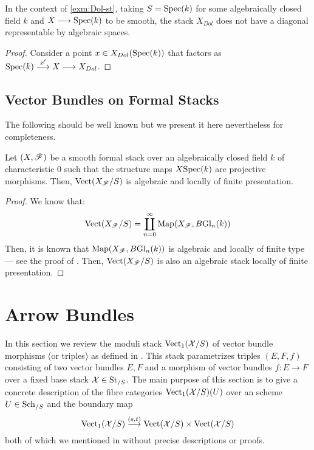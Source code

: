 \documentclass[11pt]{amsart}
\begin{document}
\begin{prop}\label{prop:Dol-st-diag-non-rep}
In the context of \cref{exm:Dol-st}, taking $S = \mathrm{Spec}(k)$ for some
algebraically closed field $k$ and $X \to \Spec(k)$ to be smooth,
the stack $X_{Dol}$ does not have a diagonal representable by algebraic spaces.
\end{prop}
\begin{proof}
Consider a point $x \in X_{Dol}(\mathrm{Spec}(k))$ that factors as
$\Spec(k) \to[x'] X \to X_{Dol}$.
\end{proof}

\subsection{Vector Bundles on Formal Stacks}


The following should be well known but we present it here nevertheless
for completeness.

\begin{thm}\label{thm:Vect-proj-form-st}
Let $(X, \mathscr{F})$ be a smooth formal stack over an algebraically closed field
$k$ of characteristic $0$ such that the structure maps
$X \mathrm{Spec}(k)$ are projective morphisms. Then,
$\mathrm{Vect}(X_\mathscr{F}/S)$ is algebraic and locally of finite presentation.
\end{thm}
\begin{proof}
We know that:
\[
\mathrm{Vect}(X_\mathscr{F}/S) = \coprod_{n = 0}^\infty \mathrm{Map}(X_\mathscr{F}, B\mathrm{Gl}_n(k))
\]
Then, it is known that $\mathrm{Map}(X_\mathscr{F}, B\mathrm{Gl}_n(k))$ is algebraic and locally of
finite type --- see the proof of \cite[Theorem 7.2]{AlgGeom-n-St}.
Then, $\mathrm{Vect}(X_\mathscr{F}/S)$ is also an algebraic stack locally of finite
presentation.
\end{proof}


\section{Arrow Bundles}

In this section we review the moduli stack $\mathrm{Vect}_1(\mathcal{X}/S)$ of vector bundle
morphisms (or triples) as defined in \cite[\S 3]{ModQuivBun}.
This stack parametrizes triples $(E, F, f)$ consisting of two vector bundles
$E, F$ and a morphism of vector bundles $f : E \to F$ over a fixed base stack
$\mathcal{X} \in \mathrm{St}_{/S}$. The main purpose of this section is to give a concrete
description of the fibre categories $\mathrm{Vect}_1(\mathcal{X}/S)(U)$ over an scheme
$U \in \mathrm{Sch}_{/S}$ and the boundary map
\[
\Vect_1(\mcX/S) \to[{(s, t)}] \Vect(\mcX/S) \times \Vect(\mcX/S)
\]
both of which we mentioned in \cite{ModQuivBun} without precise descriptions
or proofs.
\end{document}
